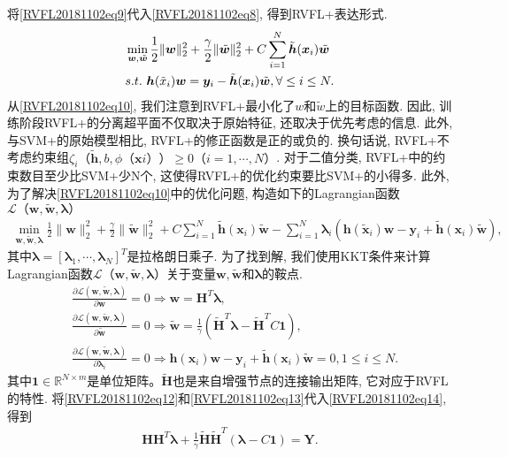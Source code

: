 {将\eqref{RVFL20181102eq9}代入\eqref{RVFL20181102eq8}, 得到RVFL+表达形式.
\begin{align}
&\min\limits_{{\bm w},\tilde {\bm w}} \frac 1 2\|{\bm w}\|_2^ 2 + \frac \gamma 2 \|\tilde {\bm w}\|_2^ 2 + C\sum_{i=1}^N  {\tilde {\bm h}}({\bm x}_i)\tilde {\bm w}\notag\\
&s.t.\,\,\bm h(\tilde x_i){\bm w} =\bm y_i - {\tilde {\bm h}}({\bm x}_i)\tilde {\bm w}, \forall \leq i \leq  N.\label{RVFL20181102eq10}
\end{align}
从\eqref{RVFL20181102eq10}, 我们注意到RVFL+最小化了$w$和$\tilde w$上的目标函数. 因此, 训练阶段RVFL+的分离超平面不仅取决于原始特征, 还取决于优先考虑的信息.
此外, 与SVM+的原始模型相比\cite{VAPNIK2009544}, RVFL+的修正函数是正的或负的.
换句话说, RVFL+不考虑约束组$\zeta_i（\tilde{\bm h}, b, \phi（{\bm x}i））\geq 0（i=1, \cdots, N）$.
对于二值分类, RVFL+中的约束数目至少比SVM+少N个, 这使得RVFL+的优化约束要比SVM+的小得多.
此外, 为了解决\eqref{RVFL20181102eq10}中的优化问题, 构造如下的Lagrangian函数$\mathscr L（\bm w, \tilde{\bm w}, \bm\lambda）$
\begin{align}
\min\limits_{\bm w, \tilde{\bm w},\bm \lambda} \frac 1 2\|{\bm w}\|_2^ 2 + \frac \gamma 2 \|\tilde {\bm w}\|_2^ 2 + C\sum_{i=1}^N  {\tilde {\bm h}}({\bm x}_i)\tilde {\bm w}-\sum_{i=1}^N  \bm \lambda_i(\bm h(\tilde {\bm x}_i){\bm w} -\bm y_i +{\tilde {\bm h}}({\bm x}_i)\tilde {\bm w}),
\end{align}
其中$\bm\lambda=[\bm\lambda_1, \cdots, \bm\lambda_N]^T$是拉格朗日乘子. 为了找到解, 我们使用KKT条件来计算Lagrangian函数$\mathscr L（\bm w, \tilde{\bm w},\bm\lambda）$关于变量$\bm w,\tilde{\bm w}$和$\bm\lambda$的鞍点.
\begin{align}
 &\frac {\partial \mathscr L (\bm w, \tilde{\bm w},\bm \lambda)}{\partial \bm w}= 0 \Rightarrow  \bm w = \bm  H^T \bm \lambda, \label{RVFL20181102eq12}\\
 &\frac {\partial \mathscr L (\bm w, \tilde{\bm w},\bm \lambda)}{\partial \tilde{\bm w}} = 0 \Rightarrow  \tilde{\bm w} = \frac 1  \gamma  (\tilde{\bm  H}^T  \bm \lambda - \tilde{\bm  H}^T C \bm 1), \label{RVFL20181102eq13}\\
 &\frac {\partial \mathscr L (\bm w, \tilde{\bm w},\bm \lambda)}{\partial \bm \lambda_i} = 0 \Rightarrow  \bm h(\bm x_i)\bm w - \bm y_i + \tilde {\bm h}({\bm x}_i) \tilde{\bm w} = 0, 1 \leq  i \leq  N.\label{RVFL20181102eq14}
\end{align}
其中$\bm 1\in\mathbb R^{N\times m}$是单位矩阵。$\tilde{\bm H}$也是来自增强节点的连接输出矩阵, 它对应于RVFL的特性.
将\eqref{RVFL20181102eq12}和\eqref{RVFL20181102eq13}代入\eqref{RVFL20181102eq14}, 得到
\begin{align}
  \bm H \bm H^T  \bm \lambda + \frac 1 \gamma\tilde{\bm H} \tilde{\bm H}^T  (\bm \lambda -C \bm 1) = \bm Y. \label{RVFL20181102eq15}
\end{align}

}

